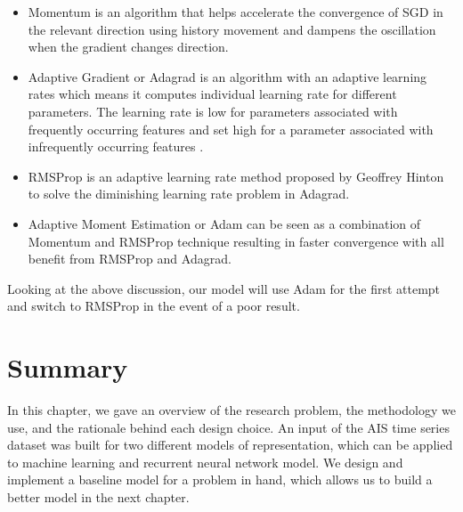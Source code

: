 \begin{itemize}
    \item Momentum \cite{qian1999momentum} is an algorithm that helps accelerate the convergence of SGD in the relevant direction using history movement and dampens the oscillation when the gradient changes direction.
    \item Adaptive Gradient or Adagrad \cite{duchi2011adaptive} is an algorithm with an adaptive learning rates which means it computes individual learning rate for different parameters. The learning rate is low for parameters associated with frequently occurring features and set high for a parameter associated with infrequently occurring features \cite{optimizationruder}.
    \item RMSProp is an adaptive learning rate method proposed by Geoffrey Hinton to solve the diminishing learning rate problem in Adagrad.
    \item Adaptive Moment Estimation or Adam \cite{kingma2014adam} can be seen as a combination of Momentum and RMSProp technique resulting in faster convergence with all benefit from RMSProp and Adagrad.
\end{itemize}

Looking at the above discussion, our model will use Adam for the first attempt and switch to RMSProp in the event of a poor result.

\section{Summary}
In this chapter, we gave an overview of the research problem, the methodology we use, and the rationale behind each design choice. An input of the AIS time series dataset was built for two different models of representation, which can be applied to machine learning and recurrent neural network model. We design and implement a baseline model for a problem in hand, which allows us to build a better model in the next chapter.
